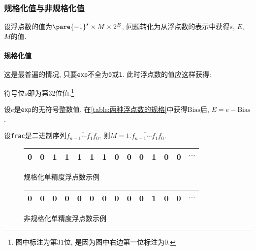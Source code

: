 \documentclass{ctexart}
\def\binaryseq#1{{\texttt{#1}}}
\begin{document}

\subsubsection{规格化值与非规格化值} %
\label{ssub:规格化值与非规格化值}

设浮点数的值为$\pare{-1}^s\times M\times 2^E$, 问题转化为从浮点数的表示中获得$s$, $E$, $M$的值.

\paragraph{规格化值} %
\label{par:规格化值}

这是最普遍的情况, 只要\colorbox{expgreencolor}{\texttt{exp}}不全为\binaryseq{0}或\binaryseq{1}. 此时浮点数的值应这样获得:
\begin{cenum}
    \item 符号位$s$即为\colorbox{signbluecolor}{第32位}值.\footnote{图中标注为第$31$位, 是因为图中右边第一位标注为$0$.}
    \item 设$e$是\colorbox{expgreencolor}{\texttt{exp}}的无符号整数值, 在\cref{table:两种浮点数的规格}中获得$\mathrm{Bias}$后, $E = e - \mathrm{Bias}$.
    \item 设\colorbox{significandcolor}{\texttt{frac}}是二进制序列$\overline{f_{n-1}\cdots f_1f_0}$, 则$M = \overline{1.f_{n-1}\cdots f_1f_0}$.
\end{cenum}
\begin{figure}[h]
    \renewcommand{\arraystretch}{1.5}
    \centering
    \begin{tabular}{|Q|EEEEEEEE|MMMMMMMMMMMMMMMMMMMMMMM|}
    &0&1&1&1&1&1&0&0&0&1&0&0&\\
    \hline
    \end{tabular}
    \caption{规格化单精度浮点数示例}
    \label{fig:规格化单精度浮点数示例}
\end{figure}
\begin{figure}[h]
    \renewcommand{\arraystretch}{1.5}
    \centering
    \begin{tabular}{|Q|EEEEEEEE|MMMMMMMMMMMMMMMMMMMMMMM|}
    &0&0&0&0&0&0&0&0&0&1&0&0&\\
    \hline
    \end{tabular}
    \caption{非规格化单精度浮点数示例}
    \label{fig:非规格化单精度浮点数示例}
\end{figure}
\end{document}
